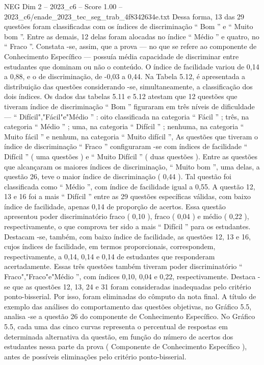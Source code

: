 \begin{textsample}{NEG Dim 2 – 2023\_c6 – Score 1.00 – 2023\_c6/enade\_2023\_tec\_seg\_trab\_4f8342634e.txt}
Dessa forma, 13 das 29 questões foram classificadas com os índices de discriminação “ Bom ” e “ Muito bom ”.
Entre as demais, 12 delas foram alocadas no índice “ Médio ” e quatro, no “ Fraco ”.
Constata -se, assim, que a prova — no que se refere ao componente de Conhecimento Específico — possuía média capacidade de discriminar entre estudantes que dominam ou não o conteúdo.
O índice de facilidade variou de 0,14 a 0,88, e o de discriminação, de -0,03 a 0,44.
Na Tabela 5.12, é apresentada a distribuição das questões considerando -se, simultaneamente, a classificação dos dois índices.
Os dados das tabelas 5.11 e 5.12 atestam que 12 questões que tiveram índice de discriminação “ Bom ” figuraram em três níveis de dificuldade — “ Difícil","Fácil"e"Médio ” : oito classificada na categoria “ Fácil ” ; três, na categoria “ Médio ” ; uma, na categoria “ Difícil ” ; nenhuma, na categoria “ Muito fácil ” e nenhum, na categoria “ Muito difícil ”, As questões que tiveram o índice de discriminação “ Fraco ” configuraram -se com índices de facilidade “ Difícil ” ( uma questões ) e “ Muito Difícil ” ( duas questões ).
Entre as questões que alcançaram os maiores índices de discriminação, “ Muito bom ”, uma delas, a questão 26, teve o maior índice de discriminação ( 0,44 ).
Tal questão foi classificada como “ Médio ”, com índice de facilidade igual a 0,55.
A questão 12, 13 e 16 foi a mais “ Difícil ” entre as 29 questões específicas válidas, com baixo índice de facilidade, apenas 0,14 de proporção de acertos.
Essa questão apresentou poder discriminatório fraco ( 0,10 ), fraco ( 0,04 ) e médio ( 0,22 ), respectivamente, o que comprova ter sido a mais “ Difícil ” para os estudantes.
Destacam -se, também, com baixo índice de facilidade, as questões 12, 13 e 16, cujos índices de facilidade, em termos proporcionais, correspondem, respectivamente, a 0,14, 0,14 e 0,14 de estudantes que responderam acertadamente.
Essas três questões também tiveram poder discriminatório “ Fraco","Fraco"e"Médio ”, com índices 0,10, 0,04 e 0,22, respectivamente.
Destaca -se que as questões 12, 13, 24 e 31 foram consideradas inadequadas pelo critério ponto-bisserial.
Por isso, foram eliminadas do cômputo da nota final.
A título de exemplo das análises do comportamento das questões objetivas, no Gráfico 5.5, analisa -se a questão 26 do componente de Conhecimento Específico.
No Gráfico 5.5, cada uma das cinco curvas representa o percentual de respostas em determinada alternativa da questão, em função do número de acertos dos estudantes nessa parte da prova ( Componente de Conhecimento Específico ), antes de possíveis eliminações pelo critério ponto-bisserial.

\end{textsample}
